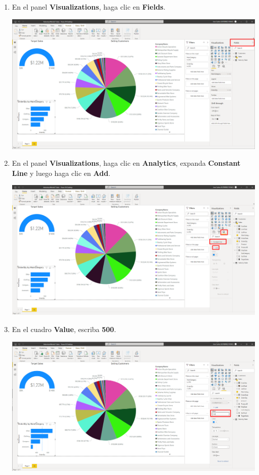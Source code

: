 \documentclass[12pt,letterpaper]{article}
\newcommand\tab[1][1cm]{\hspace*{#1}}
\begin{document}
\begin{enumerate}[\tab 1.]
\begin{center}
        \end{center}
        \item En el panel \textbf{Visualizations}, haga clic en \textbf{Fields}.
        \begin{center}
            \includegraphics[width=13cm]{./img/img92.png}
        \end{center}
        \item En el panel \textbf{Visualizations}, haga clic en \textbf{Analytics}, expanda \textbf{Constant Line} y luego haga clic en \textbf{Add}.
        \begin{center}
            \includegraphics[width=13cm]{./img/img94.png}
        \end{center}
        \item En el cuadro \textbf{Value}, escriba \textbf{500}.
        \begin{center}
            \includegraphics[width=13cm]{./img/img95.png}

\end{center}
\end{enumerate}
\end{document}
